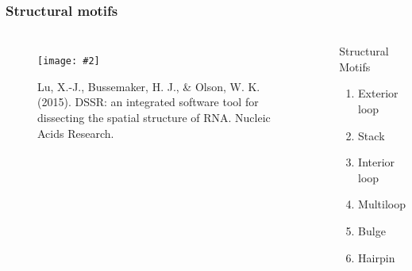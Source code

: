\documentclass{beamer}
\newcommand{\slidefigure}[2][1]{\centering\texttt{[image: \#2]}}
\begin{document}
\begin{frame}
  \frametitle{Structural motifs}
  \begin{columns}
    \begin{figure}
      \slidefigure{rnass} \caption{Lu, X.-J., Bussemaker, H. J., \& Olson, W. K. (2015). DSSR: an integrated software tool for dissecting the spatial structure of RNA. Nucleic Acids Research.}
    \end{figure}

    \begin{block}
      {Structural Motifs}
      \begin{enumerate}
        \item Exterior loop
        \item Stack
        \item Interior loop
        \item Multiloop
        \item Bulge
        \item Hairpin
      \end{enumerate}
    \end{block}
  \end{columns}
\end{frame}
\end{document}
